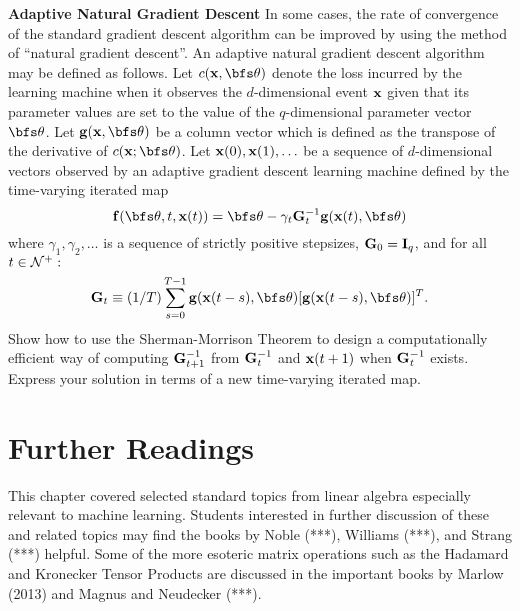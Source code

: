\begin{exerciselist}
\item
\label{Ch4:Exercise:AdaptiveNaturalGradient}
{\bf Adaptive Natural Gradient Descent}
In some cases, the rate of convergence of the standard gradient descent algorithm can be improved
by using the method of ``natural gradient descent''.
An adaptive natural gradient descent algorithm may be defined as follows.
Let $c({\bf x}, {\bfs \theta})$ denote the loss incurred by the learning machine when it observes
the $d$-dimensional
event ${\bf x}$ given that its parameter values are set to the value of the $q$-dimensional parameter vector ${\bfs \theta}$.
Let ${\bf g}({\bf x}, {\bfs \theta})$ be a column vector which is defined as the transpose of the derivative
of $c({\bf x}; {\bfs \theta})$. 
Let ${\bf x}(0), {\bf x}(1), \ldots$ be a sequence of $d$-dimensional vectors observed by 
an adaptive gradient descent learning machine defined by the time-varying iterated map
\begin{displaymath}
{\bf f}({\bfs \theta},t,{\bf x}(t)) = {\bfs \theta} - \gamma_t {\bf G}_t^{-1} {\bf g}({\bf x}(t), {\bfs \theta})
\end{displaymath}
where $\gamma_1, \gamma_2, \ldots$ is a sequence of strictly positive stepsizes, ${\bf G}_0 = {\bf I}_q$, and for all
$t \in {\cal N}^{+}:$
\begin{displaymath}
{\bf G}_t \equiv (1/T) \sum_{s=0}^{T-1} {\bf g}({\bf x}(t-s), {\bfs \theta}) [{\bf g}({\bf x}(t-s), {\bfs \theta})]^T.
\end{displaymath}
Show how to use the Sherman-Morrison Theorem to design a computationally efficient way of computing
${\bf G}_{t+1}^{-1}$ from ${\bf G}_t^{-1}$ and ${\bf x}(t+1)$ when ${\bf G}_t^{-1}$ exists.
Express your solution in terms of a new time-varying iterated map.
%
%
\end{exerciselist}

\section{Further Readings}
This chapter covered selected standard topics from linear algebra especially
relevant to machine learning. Students interested
in further discussion of these and related topics may find the books by Noble (***), 
Williams (***), and Strang (***) helpful. Some of the more esoteric matrix operations
such as the Hadamard and Kronecker Tensor Products are discussed in the important
books by Marlow (2013)
and Magnus and Neudecker (***).











